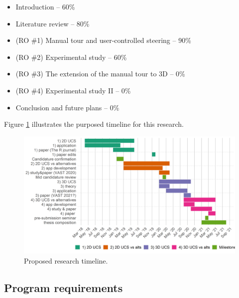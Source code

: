 \documentclass[
  11,
]{article}
\providecommand{\tightlist}{%
  \setlength{\itemsep}{0pt}\setlength{\parskip}{0pt}}
\begin{document}
\begin{itemize}
\tightlist
\item
  Introduction -- 60\%
\item
  Literature review -- 80\%
\item
  (RO \#1) Manual tour and user-controlled steering -- 90\%
\item
  (RO \#2) Experimental study -- 60\%
\item
  (RO \#3) The extension of the manual tour to 3D -- 0\%
\item
  (RO \#4) Experimental study II -- 0\%
\item
  Conclusion and future plans -- 0\%
\end{itemize}

Figure \ref{fig:timeline} illustrates the purposed timeline for this research.

\begin{figure}[h]

{\centering \includegraphics[width=1\linewidth,]{figures/phd_timeline} 

}

\caption{Proposed research timeline.}\label{fig:timeline}
\end{figure}

\hypertarget{program-requirements}{%
\subsection{Program requirements}\label{program-requirements}}
\end{document}
